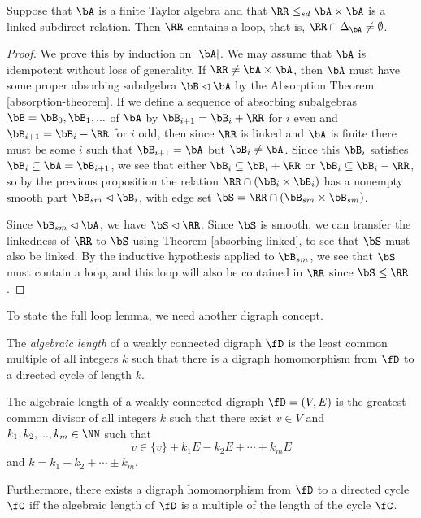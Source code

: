 \begin{lem}\label{loop-linked} Suppose that $\bA$ is a finite Taylor algebra and that $\RR \le_{sd} \bA\times \bA$ is a linked subdirect relation. Then $\RR$ contains a loop, that is, $\RR \cap \Delta_{\bA} \ne \emptyset$.
\end{lem}
\begin{proof} We prove this by induction on $|\bA|$. We may assume that $\bA$ is idempotent without loss of generality. If $\RR \ne \bA\times \bA$, then $\bA$ must have some proper absorbing subalgebra $\bB \lhd \bA$ by the Absorption Theorem \ref{absorption-theorem}. If we define a sequence of absorbing subalgebras $\bB = \bB_0, \bB_1, ...$ of $\bA$ by $\bB_{i+1} = \bB_i + \RR$ for $i$ even and $\bB_{i+1} = \bB_i - \RR$ for $i$ odd, then since $\RR$ is linked and $\bA$ is finite there must be some $i$ such that $\bB_{i+1} = \bA$ but $\bB_i \ne \bA$. Since this $\bB_i$ satisfies $\bB_i \subseteq \bA = \bB_{i+1}$, we see that either $\bB_i \subseteq \bB_i + \RR$ or $\bB_i \subseteq \bB_i - \RR$, so by the previous proposition the relation $\RR \cap (\bB_i \times \bB_i)$ has a nonempty smooth part $\bB_{sm} \lhd \bB_i$, with edge set $\bS = \RR \cap (\bB_{sm} \times \bB_{sm})$.

Since $\bB_{sm} \lhd \bA$, we have $\bS \lhd \RR$. Since $\bS$ is smooth, we can transfer the linkedness of $\RR$ to $\bS$ using Theorem \ref{absorbing-linked}, to see that $\bS$ must also be linked. By the inductive hypothesis applied to $\bB_{sm}$, we see that $\bS$ must contain a loop, and this loop will also be contained in $\RR$ since $\bS \le \RR$.
\end{proof}

To state the full loop lemma, we need another digraph concept.

\begin{defn} The \emph{algebraic length} of a weakly connected digraph $\fD$ is the least common multiple of all integers $k$ such that there is a digraph homomorphism from $\fD$ to a directed cycle of length $k$.
\end{defn}

\begin{prop} The algebraic length of a weakly connected digraph $\fD = (V,E)$ is the greatest common divisor of all integers $k$ such that there exist $v \in V$ and $k_1, k_2, ..., k_m \in \NN$ such that
\[
v \in \{v\} + k_1E - k_2E + \cdots \pm k_mE
\]
and $k = k_1 - k_2 + \cdots \pm k_m$.

Furthermore, there exists a digraph homomorphism from $\fD$ to a directed cycle $\fC$ iff the algebraic length of $\fD$ is a multiple of the length of the cycle $\fC$.
\end{prop}


